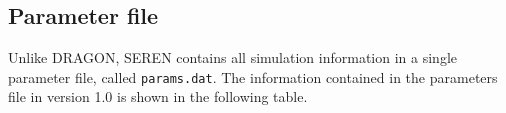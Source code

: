 \documentclass[a4paper]{article}
\newcommand{\NAME}{SEREN }
\newcommand{\var}[1]{\texttt{#1}}
\begin{document}

\vspace{1cm}


\newpage
\subsection{Parameter file} \label{SS:PARAMS}
Unlike DRAGON, \NAME contains all simulation information in a single parameter file, called \var{params.dat}.  The information contained in the parameters file in version 1.0 is shown in the following table. \newline
\end{document}
